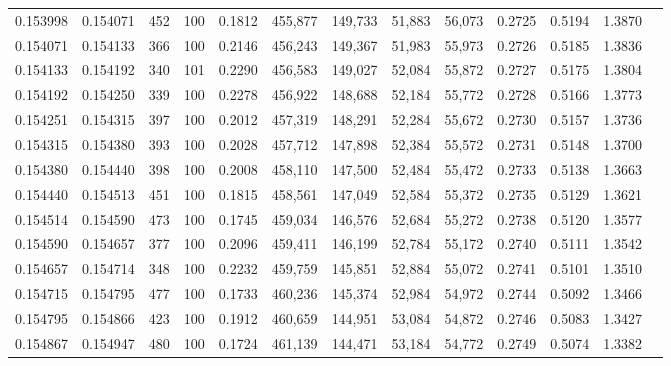 \begin{tabular}{rrrrrrrrrrrrr}
0.153998 & 0.154071 &   452 & 100 &                                     0.1812 & 455,877 & 149,733 &  51,883 &  56,073 & 0.2725 & 0.5194 & 1.3870 \\
0.154071 & 0.154133 &   366 & 100 &                                     0.2146 & 456,243 & 149,367 &  51,983 &  55,973 & 0.2726 & 0.5185 & 1.3836 \\
0.154133 & 0.154192 &   340 & 101 &                                     0.2290 & 456,583 & 149,027 &  52,084 &  55,872 & 0.2727 & 0.5175 & 1.3804 \\
0.154192 & 0.154250 &   339 & 100 &                                     0.2278 & 456,922 & 148,688 &  52,184 &  55,772 & 0.2728 & 0.5166 & 1.3773 \\
0.154251 & 0.154315 &   397 & 100 &                                     0.2012 & 457,319 & 148,291 &  52,284 &  55,672 & 0.2730 & 0.5157 & 1.3736 \\
0.154315 & 0.154380 &   393 & 100 &                                     0.2028 & 457,712 & 147,898 &  52,384 &  55,572 & 0.2731 & 0.5148 & 1.3700 \\
0.154380 & 0.154440 &   398 & 100 &                                     0.2008 & 458,110 & 147,500 &  52,484 &  55,472 & 0.2733 & 0.5138 & 1.3663 \\
0.154440 & 0.154513 &   451 & 100 &                                     0.1815 & 458,561 & 147,049 &  52,584 &  55,372 & 0.2735 & 0.5129 & 1.3621 \\
0.154514 & 0.154590 &   473 & 100 &                                     0.1745 & 459,034 & 146,576 &  52,684 &  55,272 & 0.2738 & 0.5120 & 1.3577 \\
0.154590 & 0.154657 &   377 & 100 &                                     0.2096 & 459,411 & 146,199 &  52,784 &  55,172 & 0.2740 & 0.5111 & 1.3542 \\
0.154657 & 0.154714 &   348 & 100 &                                     0.2232 & 459,759 & 145,851 &  52,884 &  55,072 & 0.2741 & 0.5101 & 1.3510 \\
0.154715 & 0.154795 &   477 & 100 &                                     0.1733 & 460,236 & 145,374 &  52,984 &  54,972 & 0.2744 & 0.5092 & 1.3466 \\
0.154795 & 0.154866 &   423 & 100 &                                     0.1912 & 460,659 & 144,951 &  53,084 &  54,872 & 0.2746 & 0.5083 & 1.3427 \\
0.154867 & 0.154947 &   480 & 100 &                                     0.1724 & 461,139 & 144,471 &  53,184 &  54,772 & 0.2749 & 0.5074 & 1.3382 \\

\end{tabular}
